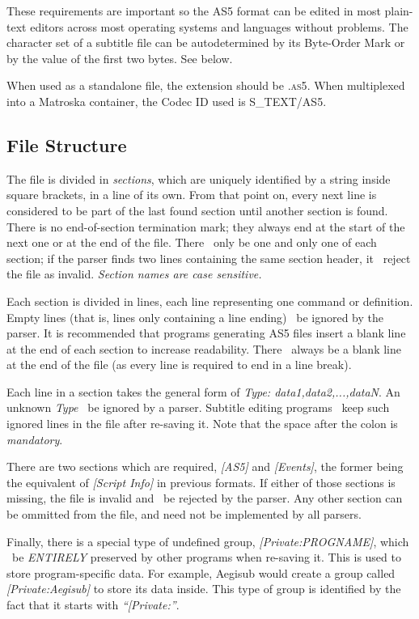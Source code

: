 \documentclass{spec}
\begin{document}
These requirements are important so the AS5 format can be edited in most plain-text editors
across most operating systems and languages without problems. The character set of a
subtitle file can be autodetermined by its Byte-Order Mark or by the value of the first
two bytes. See below.

When used as a standalone file, the extension should be \textsc{.as5}. When multiplexed
into a Matroska container, the Codec ID used is \textsc{S\_TEXT/AS5}.



\subsection{File Structure}
The file is divided in \emph{sections}, which are uniquely identified by a string inside
square brackets, in a line of its own. From that point on, every next line is considered
to be part of the last found section until another section is found. There is no end-of-section
termination mark; they always end at the start of the next one or at the end of the file.
There \must\ only be one and only one of each section; if the parser finds two lines containing
the same section header, it \must\ reject the file as invalid. \emph{Section names are case sensitive.}

Each section is divided in lines, each line representing one command or definition. Empty
lines (that is, lines only containing a line ending) \must\ be ignored by the parser.
It is recommended that programs generating AS5 files insert a blank line at the end of each
section to increase readability. There \must\ always be a blank line at the end of the file
(as every line is required to end in a line break).

Each line in a section takes the general form of \textit{Type: data1,data2,...,dataN}. An
unknown \textit{Type} \must\ be ignored by a parser. Subtitle editing programs \should\ keep
such ignored lines in the file after re-saving it. Note that the space after the colon is \emph{mandatory}.

There are two sections which are required, \emph{[AS5]} and \emph{[Events]}, the former being
the equivalent of \emph{[Script Info]} in previous formats. If either of those sections is
missing, the file is invalid and \must\ be rejected by the parser. Any other section
can be ommitted from the file, and need not be implemented by all parsers.

Finally, there is a special type of undefined group, \emph{[Private:PROGNAME]}, which 
\must\ be \emph{ENTIRELY} preserved by other programs when re-saving it. This is used to
store program-specific data. For example, Aegisub would create a group called
\emph{[Private:Aegisub]} to store its data inside. This type of group is identified
by the fact that it starts with \emph{``[Private:''}.
\end{document}
